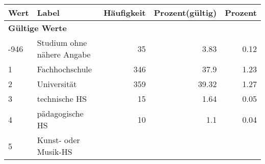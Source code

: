      \begin{longtable}{lXrrr}
     \toprule
     \textbf{Wert} & \textbf{Label} & \textbf{Häufigkeit} & \textbf{Prozent(gültig)} & \textbf{Prozent} \\
     \endhead
     \midrule
     \multicolumn{5}{l}{\textbf{Gültige Werte}}\\

     -946 &
     \multicolumn{1}{X}{ Studium ohne nähere Angabe   } &


       \num{35} &
       \num[round-mode=places,round-precision=2]{3,83} &
         \num[round-mode=places,round-precision=2]{0,12} \\

     1 &
     \multicolumn{1}{X}{ Fachhochschule   } &


       \num{346} &
       \num[round-mode=places,round-precision=2]{37,9} &
         \num[round-mode=places,round-precision=2]{1,23} \\

     2 &
     \multicolumn{1}{X}{ Universität   } &


       \num{359} &
       \num[round-mode=places,round-precision=2]{39,32} &
         \num[round-mode=places,round-precision=2]{1,27} \\

     3 &
     \multicolumn{1}{X}{ technische HS   } &


       \num{15} &
       \num[round-mode=places,round-precision=2]{1,64} &
         \num[round-mode=places,round-precision=2]{0,05} \\

     4 &
     \multicolumn{1}{X}{ pädagogische HS   } &


       \num{10} &
       \num[round-mode=places,round-precision=2]{1,1} &
         \num[round-mode=places,round-precision=2]{0,04} \\

     5 &
     \multicolumn{1}{X}{ Kunst- oder Musik-HS   } &



\end{longtable}
